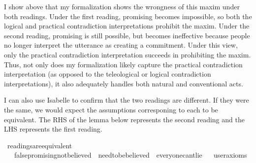 \begin{isabellebody}
\begin{isamarkuptext}
I show above that my formalization shows the wrongness of this maxim under both readings. Under the 
first reading, promising becomes impossible, so both the logical and 
practical contradiction interpretations prohibit the maxim. Under the second reading, promising is still
possible, but becomes ineffective because people no longer interpret the utterance as creating a commitment.
Under this view, only the practical contradiction interpretation succeeds in prohibiting the maxim. Thus, 
not only does my formalization likely capture the practical contradiction interpretation (as opposed to 
the teleological or logical contradiction interpretations), it also adequately handles both natural 
and conventional acts.%
\end{isamarkuptext}\isamarkuptrue%
%
\begin{isamarkuptext}%
I can also use Isabelle to confirm that the two readings are different. If they were the same, 
we would expect the assumptions corresponing to each to be equivalent. The RHS of the lemma below represents 
the second reading and the LHS represents the first reading.%
\end{isamarkuptext}\isamarkuptrue%
\isamarkupfalse%
\ readings{\isacharunderscore}are{\isacharunderscore}equivalent{\isacharcolon}\isanewline
\ \ \ {\isachardoublequoteopen}false{\isacharunderscore}promising{\isacharunderscore}not{\isacharunderscore}believed\ {\isasymand}\ need{\isacharunderscore}to{\isacharunderscore}be{\isacharunderscore}believed\ {\isasymequiv}\ everyone{\isacharunderscore}can{\isacharprime}t{\isacharunderscore}lie{\isachardoublequoteclose}\isanewline
\ \ \isamarkupfalse%
{\isacharbrackleft}user{\isacharunderscore}axioms{\isacharbrackright}%
\isadelimproof
\ %
\endisadelimproof
%
\isatagproof
{}\isamarkupfalse%
\isanewline
%
%
\endisatagproof
{\isafoldproof}%
%
\isadelimproof
%
\endisadelimproof
\isanewline
%
\isadelimtheory
\isanewline
%
\endisadelimtheory
%
\isatagtheory
{}\isamarkupfalse%
%
\endisatagtheory
{\isafoldtheory}%
%
\isadelimtheory
%
\endisadelimtheory
%
\end{isabellebody}%
\endinput
